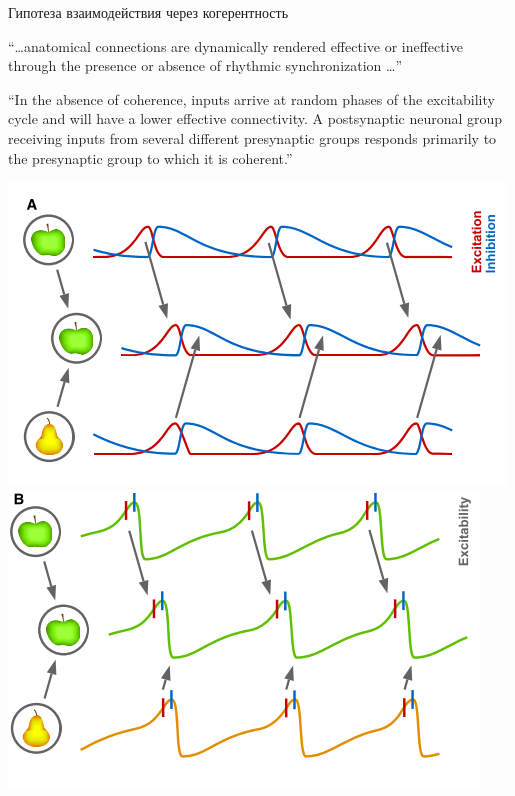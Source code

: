 \documentclass[12pt]{beamer}
\begin{document}
\begin{frame}{Гипотеза взаимодействия через когерентность}
    

    {\footnotesize``\ldots anatomical connections are dynamically rendered effective or ineffective through the presence or absence of rhythmic synchronization \ldots'' {\tiny\cite{Bastos2015}}}

    {\footnotesize ``In the absence of coherence, inputs arrive at random phases of the excitability cycle and will have a lower effective connectivity. A postsynaptic neuronal group receiving inputs from several different presynaptic groups responds primarily to the presynaptic group to which it is coherent.'' {\tiny\cite{Fries2015}}}
    
    \centering
    \includegraphics[scale=0.28]{CTC.png}
    \includegraphics[scale=0.26]{CTC1.png}
\end{frame}

\end{document}
